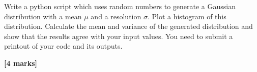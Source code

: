 \begin{enumerate}
Write a python script which uses random numbers to generate a Gaussian distribution with a mean $\mu$ and a resolution $\sigma$.
Plot a histogram of  this distribution.
Calculate the mean and variance  of the generated distribution and show 
that the results agree with your input values.
You need to submit a printout of your code and its outputs.

\hfill {\bf [4 marks]}

\end{enumerate}